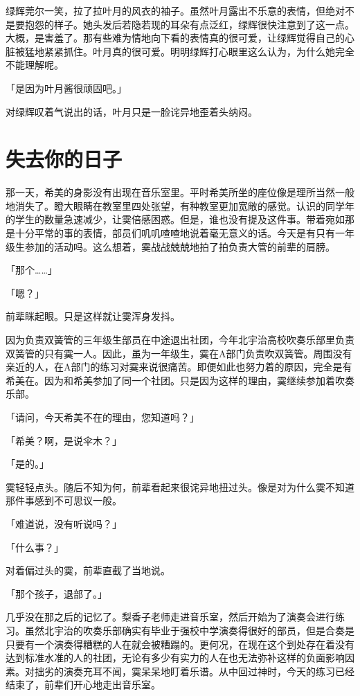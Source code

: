 \documentclass[UTF8]{ctexart}
\begin{document}
    绿辉莞尔一笑，拉了拉叶月的风衣的袖子。虽然叶月露出不乐意的表情，但绝对不是要抱怨的样子。她头发后若隐若现的耳朵有点泛红，绿辉很快注意到了这一点。大概，是害羞了。那有些难为情地向下看的表情真的很可爱，让绿辉觉得自己的心脏被猛地紧紧抓住。叶月真的很可爱。明明绿辉打心眼里这么认为，为什么她完全不能理解呢。

    「是因为叶月酱很顽固吧。」

    对绿辉叹着气说出的话，叶月只是一脸诧异地歪着头纳闷。
    \section{失去你的日子}
    那一天，希美的身影没有出现在音乐室里。平时希美所坐的座位像是理所当然一般地消失了。瞪大眼睛在教室里四处张望，有种教室更加宽敞的感觉。认识的同学年的学生的数量急速减少，让霙倍感困惑。但是，谁也没有提及这件事。带着宛如那是十分平常的事的表情，部员们叽叽喳喳地说着毫无意义的话。今天是有只有一年级生参加的活动吗。这么想着，霙战战兢兢地拍了拍负责大管的前辈的肩膀。

    「那个……」

    「嗯？」

    前辈眯起眼。只是这样就让霙浑身发抖。

    因为负责双簧管的三年级生部员在中途退出社团，今年北宇治高校吹奏乐部里负责双簧管的只有霙一人。因此，虽为一年级生，霙在A部门负责吹双簧管。周围没有亲近的人，在A部门的练习对霙来说很痛苦。即便如此也努力着的原因，完全是有希美在。因为和希美参加了同一个社团。只是因为这样的理由，霙继续参加着吹奏乐部。

    「请问，今天希美不在的理由，您知道吗？」

    「希美？啊，是说伞木？」

    「是的。」

    霙轻轻点头。随后不知为何，前辈看起来很诧异地扭过头。像是对为什么霙不知道那件事感到不可思议一般。

    「难道说，没有听说吗？」

    「什么事？」

    对着偏过头的霙，前辈直截了当地说。

    「那个孩子，退部了。」

    几乎没在那之后的记忆了。梨香子老师走进音乐室，然后开始为了演奏会进行练习。虽然北宇治的吹奏乐部确实有毕业于强校中学演奏得很好的部员，但是合奏是只要有一个演奏得糟糕的人在就会被糟蹋的。更何况，在现在这个到处存在着没有达到标准水准的人的社团，无论有多少有实力的人在也无法弥补这样的负面影响因素。对拙劣的演奏充耳不闻，霙呆呆地盯着乐谱。从中回过神时，今天的练习已经结束了，前辈们开心地走出音乐室。
\end{document}
